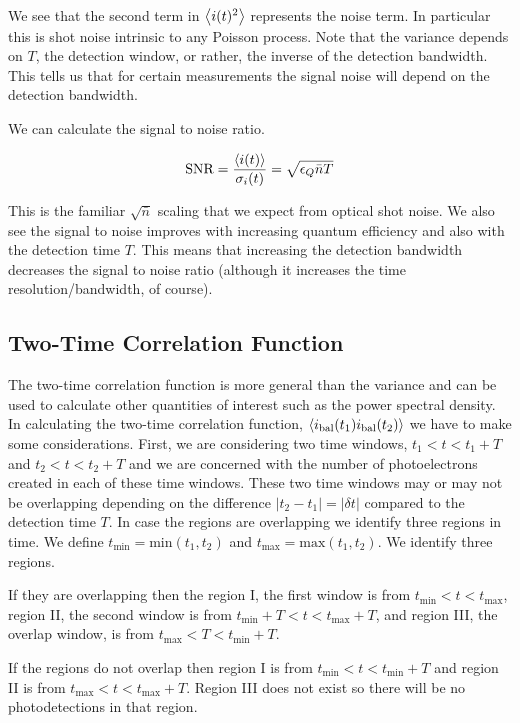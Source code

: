 \documentclass[12pt]{article}
\begin{document}
We see that the second term in $\Braket{i(t)^2}$ represents the noise term. In particular this is shot noise intrinsic to any Poisson process. Note that the variance depends on $T$, the detection window, or rather, the inverse of the detection bandwidth. This tells us that for certain measurements the signal noise will depend on the detection bandwidth.

 We can calculate the signal to noise ratio.

\begin{align}
\label{SNR}
\text{SNR} = \frac{\Braket{i(t)}}{\sigma_i(t)} = \sqrt{\epsilon_Q \bar{n} T}
\end{align}

This is the familiar $\sqrt{\bar{n}}$ scaling that we expect from optical shot noise. We also see the signal to noise improves with increasing quantum efficiency and also with the detection time $T$. This means that increasing the detection bandwidth decreases the signal to noise ratio (although it increases the time resolution/bandwidth, of course).

\subsection{Two-Time Correlation Function}

The two-time correlation function is more general than the variance and can be used to calculate other quantities of interest such as the power spectral density. In calculating the two-time correlation function, $\Braket{i_{\text{bal}}(t_1)i_{\text{bal}}(t_2)}$ we have to make some considerations. First, we are considering two time windows, $t_1<t<t_1+T$ and $t_2<t<t_2+T$ and we are concerned with the number of photoelectrons created in each of these time windows. These two time windows may or may not be overlapping depending on the difference $|t_2-t_1|=|\delta t|$ compared to the detection time $T$. In case the regions are overlapping we identify three regions in time. We define $t_{\text{min}} = \text{min}(t_1,t_2)$ and $t_{\text{max}} = \text{max}(t_1,t_2)$. We identify three regions. 

If they are overlapping then the region I, the first window is from $t_{\text{min}}<t<t_{\text{max}}$, region II, the second window is from $t_{\text{min}}+T<t<t_{\text{max}}+T$, and region III, the overlap window, is from $t_{\text{max}} < T < t_{\text{min}}+T$.

If the regions do not overlap then region I is from $t_{\text{min}}<t<t_{\text{min}}+T$ and region II is from $t_{\text{max}}<t<t_{\text{max}}+T$. Region III does not exist so there will be no photodetections in that region.
\end{document}
